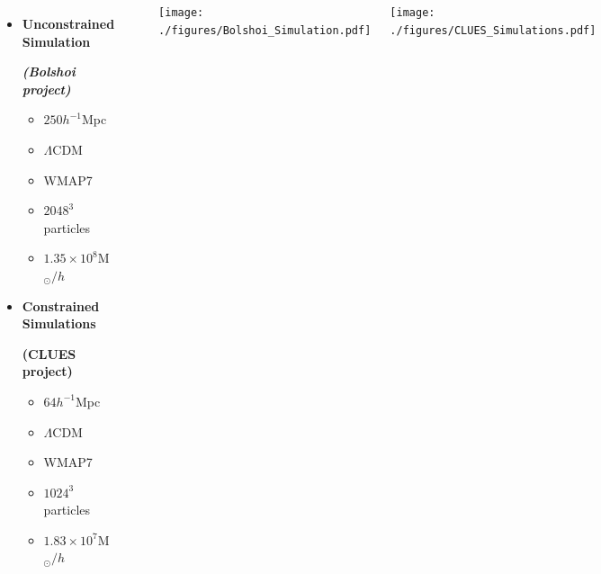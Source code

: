 \documentclass[8pt,fleqn]{beamer}
\begin{document}
\begin{frame}
\begin{tcolorbox}[colback=white!5,colframe=black!75!black,title=Simulations]\justifying
\begin{columns}
\column[t]{3cm}
	\begin{itemize}
	\color{black}
	\item \textbf{Unconstrained Simulation} 
	
	\textit{\textbf{(Bolshoi project)}}
	\begin{small}
	\begin{itemize}
	\color{black}
	\item $250 h^{-1}$Mpc
	\item $\Lambda$CDM
	\item WMAP7 \\
	\item $2048^{3}$ particles
	\item $1.35 \times 10^8$M$_{\odot}/h$	
	\end{itemize}
	\end{small}
	
	\vspace{.7cm}
	\item \textbf{Constrained Simulations} 
	
	\textbf{(CLUES project)}
	\begin{small}
	\begin{itemize}
	\color{black}
	\item $64 h^{-1}$Mpc
	\item $\Lambda$CDM
	\item WMAP7 \\
	\item $1024^{3}$ particles
	\item $1.83 \times 10^7$M$_{\odot}/h$	
	\end{itemize}
	\end{small}
	
	\end{itemize}
\column[t]{7cm}
	\
	
	\texttt{[image: ./figures/Bolshoi\_Simulation.pdf]}
	
	\texttt{[image: ./figures/CLUES\_Simulations.pdf]}
	
\end{columns}

\end{tcolorbox}
\end{frame}
\end{document}
